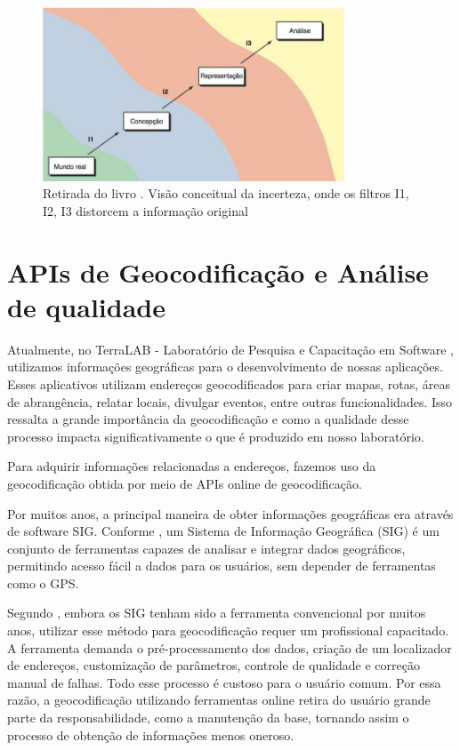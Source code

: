 \begin{figure}[ht]
   \centering
   \includegraphics[width=0.8\textwidth]{Figuras/incertezaLivro.jpeg}
   \caption{Retirada do livro \cite{longley2013}. Visão conceitual da incerteza, onde os filtros I1, I2, I3 distorcem a informação original}
   \label{fig:incerteza}
\end{figure}

\section{APIs de Geocodificação e Análise de qualidade}

Atualmente, no TerraLAB - Laboratório de Pesquisa e Capacitação em Software \cite{terralab}, utilizamos informações geográficas para o desenvolvimento de nossas aplicações. Esses aplicativos utilizam endereços geocodificados para criar mapas, rotas, áreas de abrangência, relatar locais, divulgar eventos, entre outras funcionalidades. Isso ressalta a grande importância da geocodificação e como a qualidade desse processo impacta significativamente o que é produzido em nosso laboratório.

Para adquirir informações relacionadas a endereços, fazemos uso da geocodificação obtida por meio de APIs online de geocodificação.

Por muitos anos, a principal maneira de obter informações geográficas era através de software SIG. Conforme \cite{stein2021geoprocessamento}, um Sistema de Informação Geográfica (SIG) é um conjunto de ferramentas capazes de analisar e integrar dados geográficos, permitindo acesso fácil a dados para os usuários, sem depender de ferramentas como o GPS.

Segundo \cite{Chow2016}, embora os SIG tenham sido a ferramenta convencional por muitos anos, utilizar esse método para geocodificação requer um profissional capacitado. A ferramenta demanda o pré-processamento dos dados, criação de um localizador de endereços, customização de parâmetros, controle de qualidade e correção manual de falhas. Todo esse processo é custoso para o usuário comum. Por essa razão, a geocodificação utilizando ferramentas online retira do usuário grande parte da responsabilidade, como a manutenção da base, tornando assim o processo de obtenção de informações menos oneroso.


